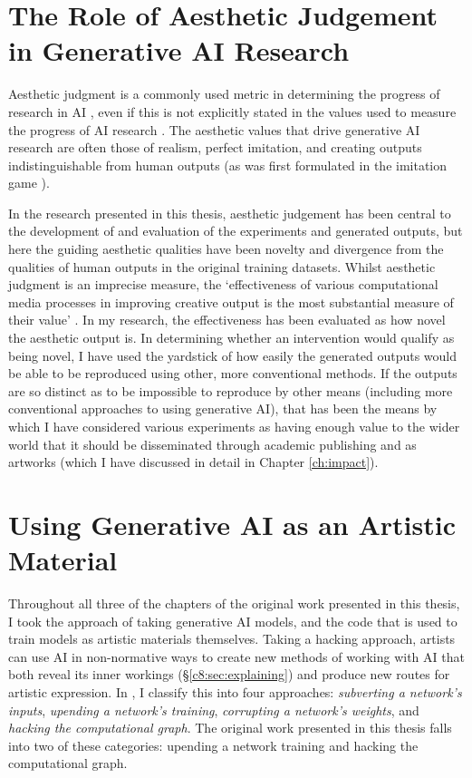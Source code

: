 \section{The Role of Aesthetic Judgement in Generative AI Research}
\label{c8:sec:aesthetic}

Aesthetic judgment is a commonly used metric in determining the progress of research in AI \citep{stanley2018art}, even if this is not explicitly stated in the values used to measure the progress of AI research \citep{birhane2022values}.
The aesthetic values that drive generative AI research are often those of realism, perfect imitation, and creating outputs indistinguishable from human outputs (as was first formulated in the imitation game \citep{machinery1950computing}). 

In the research presented in this thesis, aesthetic judgement has been central to the development of and evaluation of the experiments and generated outputs, but here the guiding aesthetic qualities have been novelty and divergence from the qualities of human outputs in the original training datasets.
Whilst aesthetic judgment is an imprecise measure, the `effectiveness of various computational media processes in improving creative output is the most substantial measure of their value' \citep{brown2009integrating}. 
In my research, the effectiveness has been evaluated as how novel the aesthetic output is. 
In determining whether an intervention would qualify as being novel, I have used the yardstick of how easily the generated outputs would be able to be reproduced using other, more conventional methods.
If the outputs are so distinct as to be impossible to reproduce by other means (including more conventional approaches to using generative AI), that has been the means by which I have considered various experiments as having enough value to the wider world that it should be disseminated through academic publishing and as artworks (which I have discussed in detail in Chapter \ref{ch:impact}).

\section{Using Generative AI as an Artistic Material}
\label{c8:sec:material}
Throughout all three of the chapters of the original work presented in this thesis, I took the approach of taking generative AI models, and the code that is used to train models as artistic materials themselves.
Taking a hacking approach, artists can use AI in non-normative ways to create new methods of working with AI that both reveal its inner workings (\S \ref{c8:sec:explaining}) and produce new routes for artistic expression. 
In \cite{broad2024using}, I classify this into four approaches: \textit{subverting a network's inputs}, \textit{upending a network's training}, \textit{corrupting a network's weights}, and \textit{hacking the computational graph}. 
The original work presented in this thesis falls into two of these categories: upending a network training and hacking the computational graph.

